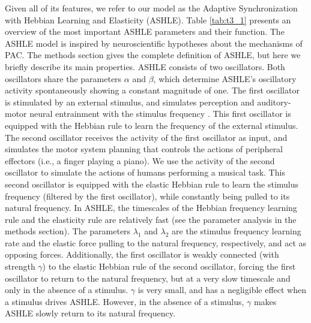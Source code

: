 \documentclass{report}
\begin{document}
Given all of its features, we refer to our model as the Adaptive Synchronization with Hebbian Learning and Elasticity (ASHLE). Table \ref{tab:t3_1} presents an overview of the most important ASHLE parameters and their function. The ASHLE model is inspired by neuroscientific hypotheses about the mechanisms of PAC. The methods section gives the complete definition of ASHLE, but here we briefly describe its main properties. ASHLE consists of two oscillators. Both oscillators share the parameters $\alpha$ and $\beta$, which determine ASHLE's oscillatory activity spontaneously showing a constant magnitude of one. The first oscillator is stimulated by an external stimulus, and simulates perception and auditory-motor neural entrainment with the stimulus frequency \cite{large2015neural, patel2014evolutionary, daly2014changes, grahn2009feeling, grahn2013finding}. This first oscillator is equipped with the Hebbian rule to learn the frequency of the external stimulus. The second oscillator receives the activity of the first oscillator as input, and simulates the motor system planning that controls the actions of peripheral effectors (i.e., a finger playing a piano). We use the activity of the second oscillator to simulate the actions of humans performing a musical task. This second oscillator is equipped with the elastic Hebbian rule to learn the stimulus frequency (filtered by the first oscillator), while constantly being pulled to its natural frequency. In ASHLE, the timescales of the Hebbian frequency learning rule and the elasticity rule are relatively fast (see the parameter analysis in the methods section). The parameters $\lambda_1$ and $\lambda_2$ are the stimulus frequency learning rate and the elastic force pulling to the natural frequency, respectively, and act as opposing forces. Additionally, the first oscillator is weakly connected (with strength $\gamma$) to the elastic Hebbian rule of the second oscillator, forcing the first oscillator to return to the natural frequency, but at a very slow timescale and only in the absence of a stimulus. $\gamma$ is very small, and has a negligible effect when a stimulus drives ASHLE. However, in the absence of a stimulus, $\gamma$ makes ASHLE slowly return to its natural frequency. 
\end{document}
